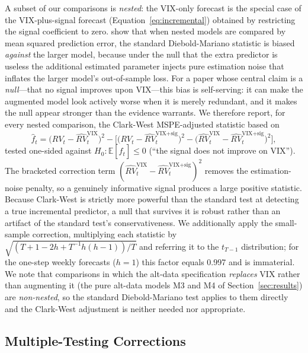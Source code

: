 \documentclass[12pt,a4paper]{article}
\begin{document}
A subset of our comparisons is \emph{nested}: the VIX-only forecast is the special case of the VIX-plus-signal forecast (Equation~\ref{eq:incremental}) obtained by restricting the signal coefficient to zero. \citet{clark2007} show that when nested models are compared by mean squared prediction error, the standard Diebold-Mariano statistic is biased \emph{against} the larger model, because under the null that the extra predictor is useless the additional estimated parameter injects pure estimation noise that inflates the larger model's out-of-sample loss. For a paper whose central claim is a \emph{null}---that no signal improves upon VIX---this bias is self-serving: it can make the augmented model look actively worse when it is merely redundant, and it makes the null appear stronger than the evidence warrants. We therefore report, for every nested comparison, the Clark-West MSPE-adjusted statistic based on
\begin{equation}
\hat{f}_t = \big(RV_t - \hat{RV}_t^{\text{VIX}}\big)^2 - \Big[\big(RV_t - \hat{RV}_t^{\text{VIX+sig}}\big)^2 - \big(\hat{RV}_t^{\text{VIX}} - \hat{RV}_t^{\text{VIX+sig}}\big)^2\Big],
\label{eq:clark_west}
\end{equation}
tested one-sided against $H_0: \mathbb{E}[\hat{f}_t] \le 0$ (``the signal does not improve on VIX''). The bracketed correction term $(\hat{RV}_t^{\text{VIX}} - \hat{RV}_t^{\text{VIX+sig}})^2$ removes the estimation-noise penalty, so a genuinely informative signal produces a large positive statistic. Because Clark-West is strictly more powerful than the standard test at detecting a true incremental predictor, a null that survives it is robust rather than an artifact of the standard test's conservativeness. We additionally apply the \citet{harvey1997} small-sample correction, multiplying each statistic by $\sqrt{(T+1-2h+T^{-1}h(h-1))/T}$ and referring it to the $t_{T-1}$ distribution; for the one-step weekly forecasts ($h=1$) this factor equals 0.997 and is immaterial. We note that comparisons in which the alt-data specification \emph{replaces} VIX rather than augmenting it (the pure alt-data models M3 and M4 of Section~\ref{sec:results}) are \emph{non-nested}, so the standard Diebold-Mariano test applies to them directly and the Clark-West adjustment is neither needed nor appropriate.

\subsection{Multiple-Testing Corrections}
\label{sec:multiple_testing}
\end{document}
